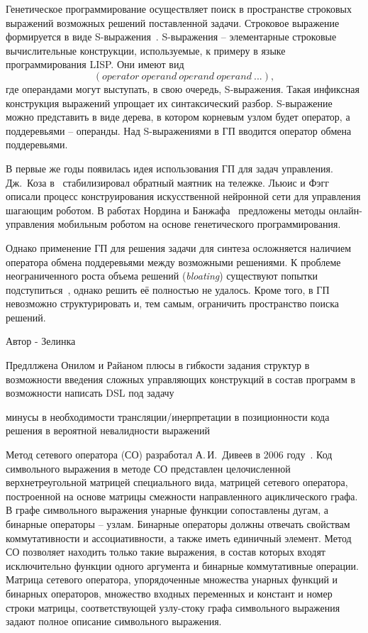 Генетическое программирование осуществляет поиск в пространстве строковых выражений возможных решений поставленной задачи.
Строковое выражение формируется в виде S-выражения~\cite{McCarthy1960}.
S-выражения -- элементарные строковые вычислительные конструкции, используемые, к примеру в языке программирования LISP. 
Они имеют вид 
\begin{equation}
    \left(operator\ operand\ operand\ operand\ ...\right),
    \label{intro:s_expression}
\end{equation}
где операндами могут выступать, в свою очередь, S-выражения.
Такая инфиксная конструкция выражений упрощает их синтаксический разбор.
S-выражение можно представить в виде дерева, в котором корневым узлом будет оператор, а поддеревьями -- операнды.
Над S-выражениями в ГП вводится оператор обмена поддеревьями.

В первые же годы появилась идея использования ГП для задач управления.
Дж.~Коза в~\cite{Koza1992} стабилизировал обратный маятник на тележке.
Льюис и Фэгг~\cite{Lewis1992} описали процесс конструирования искусственной нейронной сети для управления шагающим роботом.
В работах Нордина и Банжафа~\cite{Nordin1996, Nordin1997} предложены методы онлайн-управления мобильным роботом на основе генетического программирования.

Однако применение ГП для решения задачи для синтеза осложняется наличием оператора обмена поддеревьями между возможными решениями. 
К проблеме неограниченного роста объема решений (\textit{bloating}) существуют попытки подступиться~\cite{Trujillo2016}, однако решить её полностью не удалось.
Кроме того, в ГП невозможно структурировать и, тем самым, ограничить пространство поиска решений.

Автор - Зелинка


Предллжена Онилом и Райаном
плюсы
в гибкости задания структур
в возможности введения сложных управляющих конструкций в состав программ
в возможности написать DSL под задачу

минусы
в необходимости трансляции/инерпретации
в позиционности кода решения
в вероятной невалидности выражений

Метод сетевого оператора (СО) разработал А.\,И.~Дивеев в 2006 году~\cite{Дивеев2006}.
Код символьного выражения в методе СО представлен целочисленной верхнетреугольной матрицей специального вида, матрицей сетевого оператора, построенной на основе матрицы смежности направленного ациклического графа.
В графе символьного выражения унарные функции сопоставлены дугам, а бинарные операторы -- узлам.
Бинарные операторы должны отвечать свойствам коммутативности и ассоциативности, а также иметь единичный элемент.
Метод СО позволяет находить только такие выражения, в состав которых входят исключительно функции одного аргумента и бинарные коммутативные операции.
Матрица сетевого оператора, упорядоченные множества унарных функций и бинарных операторов, множество входных переменных и констант и номер строки матрицы, соответствующей узлу-стоку графа символьного выражения задают полное описание символьного выражения.

